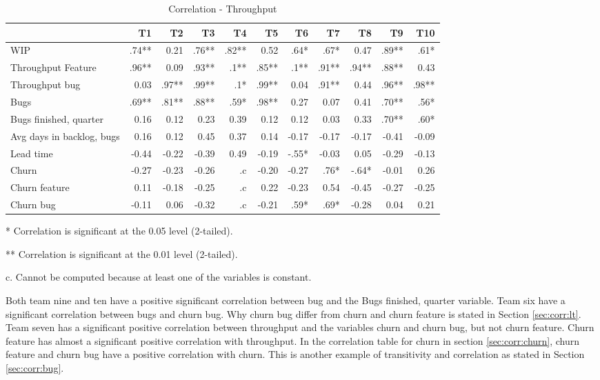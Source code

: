 \documentclass[UKenglish]{ifimaster}  %
\begin{document}
\begin{table}[!htbp]
 \begin{adjustwidth}{-1.5cm}{}
 \centering
 \begin{tabular}{|l|r|r|r|r|r|r|r|r|r|r|}
\hline
 & \bf{T1} & \bf{T2} & \bf{T3} & \bf{T4} & \bf{T5} & \bf{T6} & \bf{T7} & \bf{T8} & \bf{T9} & \bf{T10}\\ \hline
WIP &.74**& 0.21& .76**& .82**& 0.52& .64*& .67*& 0.47& .89**& .61*\\ \hline
Throughput Feature &.96**& 0.09& .93**& .1**& .85**& .1**& .91**& .94**& .88**& 0.43\\ \hline
Throughput bug &0.03& .97**& .99**& .1*& .99**& 0.04& .91**& 0.44& .96**& .98**\\ \hline
Bugs &.69**& .81**& .88**& .59*& .98**& 0.27& 0.07& 0.41& .70**& .56*\\ \hline
Bugs finished, quarter &0.16& 0.12& 0.23& 0.39& 0.12& 0.12& 0.03& 0.33& .70**& .60*\\ \hline
Avg days in backlog, bugs &0.16& 0.12& 0.45& 0.37& 0.14& -0.17& -0.17& -0.17& -0.41& -0.09\\ \hline
Lead time &-0.44& -0.22& -0.39& 0.49& -0.19& -.55*& -0.03& 0.05& -0.29& -0.13\\ \hline
Churn &-0.27& -0.23& -0.26& .c& -0.20& -0.27& .76*& -.64*& -0.01& 0.26\\ \hline
Churn feature &0.11& -0.18& -0.25& .c& 0.22& -0.23& 0.54& -0.45& -0.27& -0.25\\ \hline
Churn bug &-0.11& 0.06& -0.32& .c
& -0.21& .59*
& .69*
& -0.28& 0.04& 0.21\\ \hline
\end{tabular}
 \caption{Correlation - Throughput}
 \label{corr:TP}
 \centerline {* Correlation is significant at the 0.05 level (2-tailed).}
\centerline{** Correlation is significant at the 0.01 level (2-tailed).}
\centerline{c. Cannot be computed because at least one of the variables is constant.}
\end{adjustwidth}
\end{table}

Both team nine and ten have a positive significant correlation between bug and the Bugs finished, quarter variable. Team six have a significant correlation between bugs and churn bug. Why churn bug differ from churn and churn feature is stated in Section \ref{sec:corr:lt}. Team seven has a significant positive correlation between throughput and the variables churn and churn bug, but not churn feature. Churn feature has almost a significant positive correlation with throughput. In the correlation table for churn in section \ref{sec:corr:churn}, churn feature and churn bug have a positive correlation with churn. This is another example of transitivity and correlation as stated in Section \ref{sec:corr:bug}.
\end{document}
